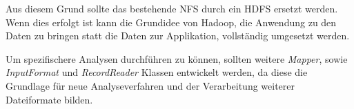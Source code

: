 Aus diesem Grund sollte das bestehende \ac{NFS} durch ein \ac{HDFS} ersetzt werden. Wenn dies erfolgt ist kann die Grundidee von Hadoop, die Anwendung zu den Daten zu bringen statt die Daten zur Applikation, vollständig umgesetzt werden.

Um spezifischere Analysen durchführen zu können, sollten weitere \textit{Mapper}, sowie \textit{InputFormat} und \textit{RecordReader} Klassen entwickelt werden, da diese die Grundlage für neue Analyseverfahren und der Verarbeitung weiterer Dateiformate bilden.

